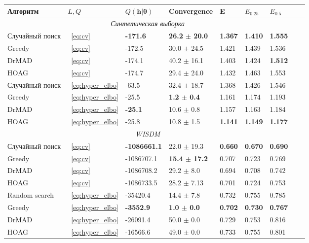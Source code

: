 \begin{table}
\small
\begin{tabularx}{\textwidth}{ |X|X|X|X|X|X|X|X|X|}

\hline
\textbf{Алгоритм} & $L, Q$  & $Q(\mathbf{h}| \boldsymbol{\theta} )$ & Convergence & E & $E_{0.25}$ & $E_{0.5}$\\ 
\hline
\multicolumn{7}{|c|}{\textit{Синтетическая выборка}}  \\
\hline
Случайный поиск & ~\eqref{eq:cv} & \bf -171.6  &\bf 26.2 $\pm$ 20.0  & \bf 1.367 &\bf 1.410 &\bf 1.555 \\
\hline
Greedy & ~\eqref{eq:cv} & -172.5 & 30.0 $\pm$ 24.5 & 1.421 & 1.439 &  1.536\\
\hline
DrMAD & ~\eqref{eq:cv} & -174.1 & 40.2 $\pm$ 16.1 &  1.403 & 1.424 & \bf 1.512 \\
\hline
HOAG & ~\eqref{eq:cv} &-174.7 & 29.4 $\pm$ 24.0 &    1.432  & 1.463 & 1.553\\
\hline
Случайный поиск & ~\eqref{eq:hyper_elbo} & -63.5  & 32.4 $\pm$ 18.7  & 1.368 & 1.426 & 1.546  \\
\hline
Greedy & ~\eqref{eq:hyper_elbo} & -25.5 & \bf 1.2 $\pm$ 0.4 & 1.161 & 1.174 & 1.193\\
\hline
DrMAD & ~\eqref{eq:hyper_elbo} & \bf -25.1 &  10.6 $\pm$ 0.8 &  1.157 & 1.163 &  1.184\\
\hline
HOAG & ~\eqref{eq:hyper_elbo} &-25.8 & 10.8 $\pm$ 1.5&   \bf 1.141  & \bf 1.149 & \bf 1.177\\
\hline


\multicolumn{7}{|c|}{\textit{WISDM}}  \\
\hline
Случайный поиск & ~\eqref{eq:cv} & \bf -1086661.1  & 22.0 $\pm$ 19.3  & \bf 0.660 & \bf 0.670 & \bf 0.690  \\
\hline
Greedy & ~\eqref{eq:cv} & -1086707.1 & \bf 15.4 $\pm$ 17.2 & 0.707 &  0.723  &  0.769\\
\hline
DrMAD & ~\eqref{eq:cv} & -1086708.2 & 29.2 $\pm$ 8.0 &  0.694 &  0.708 & 0.742 \\
\hline
HOAG & ~\eqref{eq:cv} & -1086733.5 & 28.2 $\pm$ 7.13&   0.701 & 0.724 & 0.753 \\
\hline
Random search & ~\eqref{eq:hyper_elbo} & -35420.4 &   14.4 $\pm$ 7.8  &   0.732 &   0.755 & 0.785 \\
\hline
Greedy & ~\eqref{eq:hyper_elbo} & \bf -3552.9 &\bf 1.0 $\pm$ 0.0  &   \bf 0.702 & \bf 0.730  &  \bf 0.767\\
\hline
DrMAD & ~\eqref{eq:hyper_elbo} & -26091.4 &   50.0 $\pm$ 0.0  & 0.729 &  0.753 & 0.816 \\
\hline
HOAG & ~\eqref{eq:hyper_elbo} &  -16566.6 & 49.0 $\pm$ 0.0  &  0.733 &  0.755 &  0.801 \\
\hline




\end{tabularx}
\end{table}
